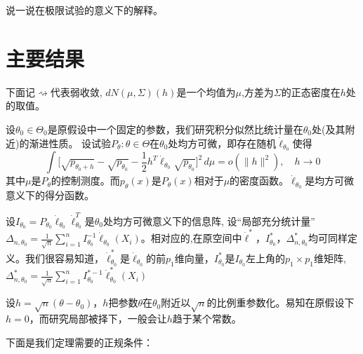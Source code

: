 \documentclass[review]{elsarticle}
\begin{document}
说一说在极限试验的意义下的解释。

\section{主要结果}

下面记$\rightsquigarrow$代表弱收敛,
$dN(\mu,\Sigma)(h)$是一个均值为$\mu$,方差为$\Sigma$的正态密度在$h$处的取值。

设$\theta_0\in\Theta_0$是原假设中一个固定的参数，我们研究积分似然比统计量在$\theta_0$处(及其附近)的渐进性质。
设试验$P_\theta : \theta\in \Theta$在$\theta_0$处均方可微，即存在随机$\dot{\ell}_{\theta_0}$使得
\begin{equation}
    \int \big[\sqrt{p_{\theta_0+h}}-\sqrt{p_{\theta_0}}-\frac{1}{2}h^T\dot{\ell}_{\theta_0}\sqrt{p_{\theta_0}}\big]^2\, d\mu=o(\|h\|^2),\quad h\to 0
\end{equation}
其中$\mu$是$P_{\theta}$的控制测度。而$p_{\theta}(x)$是$P_{\theta}(x)$相对于$\mu$的密度函数。$\dot{\ell}_{\theta_0}$是均方可微意义下的得分函数。

设$I_{\theta_0}=P_{\theta_0}\dot{\ell}_{\theta_0}\dot{\ell}_{\theta_0}^T$是$\theta_0$处均方可微意义下的信息阵,
设“局部充分统计量”$\Delta_{n,\theta_0}=\frac{1}{\sqrt{n}}\sum_{i=1}^n I_{\theta_0}^{-1}\dot{\ell}_{\theta_0}(X_i)$。相对应的,在原空间中$\dot{\ell}^*$，$I^*_{\theta_0}$，$\Delta_{n,\theta_0}^*$均可同样定义。我们很容易知道，$\dot{\ell}^*_{\theta_0}$是$\dot{\ell}_{\theta_0}$的前$p_1$维向量，$I^*_{\theta_0}$是$I_{\theta_0}$左上角的$p_1\times p_1$维矩阵,$\Delta_{n,\theta_0}^*=\frac{1}{\sqrt{n}}\sum_{i=1}^n I_{\theta_0}^{*-1}\dot{\ell}^*_{\theta_0}(X_i)$

设$h=\sqrt{n}(\theta-\theta_0)$，$h$把参数$\theta$在$\theta_0$附近以$\sqrt{n}$的比例重参数化。易知在原假设下$h=0$，而研究局部被择下，一般会让$h$趋于某个常数。

下面是我们定理需要的正规条件：
\end{document}
